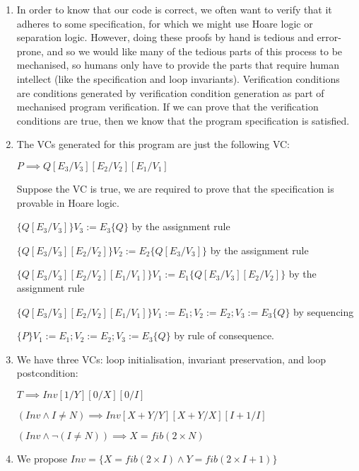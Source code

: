 


\begin{enumerate}[label=(\alph*)]

  \item
    In order to know that our code is correct, we often want to verify that it adheres to some specification, for which we might use Hoare logic or separation logic. However, doing these proofs by hand is tedious and error-prone, and so we would like many of the tedious parts of this process to be mechanised, so humans only have to provide the parts that require human intellect (like the specification and loop invariants). Verification conditions are conditions generated by verification condition generation as part of mechanised program verification. If we can prove that the verification conditions are true, then we know that the program specification is satisfied.

    \item
      The VCs generated for this program are just the following VC:

      $P \implies Q[E_3 / V_3][E_2 / V_2][E_1 / V_1]$

      Suppose the VC is true, we are required to prove that the specification is provable in Hoare logic.

      $\{Q[E_3 / V_3]\}V_3 := E_3 \{Q\}$ by the assignment rule

      $\{Q[E_3 / V_3][E_2 / V_2]\}V_2 := E_2 \{Q[E_3 / V_3]\}$ by the assignment rule

      $\{Q[E_3 / V_3][E_2 / V_2][E_1 / V_1]\}V_1 := E_1 \{Q[E_3 / V_3][E_2 / V_2]\}$ by the assignment rule

      $\{Q[E_3 / V_3][E_2 / V_2][E_1 / V_1]\}V_1 := E_1;V_2 := E_2;V_3 := E_3 \{Q\}$ by sequencing

      $\{P\}V_1:=E_1;V_2:=E_2;V_3:=E_3 \{Q\}$ by rule of consequence.

      \item
        We have three VCs: loop initialisation, invariant preservation, and loop postcondition:

        $T \implies Inv[1 / Y][0 / X][0 / I]$

        $(Inv \wedge I \neq N) \implies Inv[X + Y / Y][X + Y / X][I + 1 / I]$

        $(Inv \wedge \neg (I \neq N)) \implies X = fib(2 \times N)$

        \item
          We propose $Inv = \{X = fib(2 \times I) \wedge Y = fib(2 \times I + 1)\}$


\end{enumerate}
